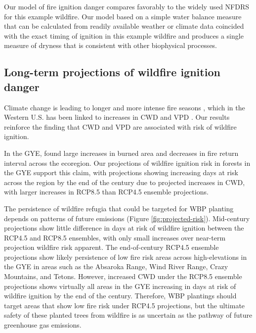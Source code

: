 \documentclass[11p]{article}
\begin{document}
Our model of fire ignition danger compares favorably to the widely used NFDRS for this example wildfire. Our model based on a simple water balance measure that can be calculated from readily available weather or climate data coincided with the exact timing of ignition in this example wildfire and produces a single measure of dryness that is consistent with other biophysical processes.

\subsection{Long-term projections of wildfire ignition danger}

Climate change is leading to longer and more intense fire seasons \citep{abatzoglouProjectedIncreasesWestern2021,littellReviewRelationshipsDrought2016,jollyClimateinducedVariationsGlobal2015}, which in the Western U.S. has been linked to increases in CWD and VPD \citep{abatzoglouImpactAnthropogenicClimate2016}. Our results reinforce the finding that CWD and VPD are associated with risk of wildfire ignition.

In the GYE, \citet{westerlingContinuedWarmingCould2011} found large increases in burned area and decreases in fire return interval across the ecoregion. Our projections of wildfire ignition risk in forests in the GYE support this claim, with projections showing increasing days at risk across the region by the end of the century due to projected increases in CWD, with larger increases in RCP8.5 than RCP4.5 ensemble projections.

The persistence of wildfire refugia that could be targeted for WBP planting depends on patterns of future emissions (Figure \ref{fig:projected-risk}). Mid-century projections show little difference in days at risk of wildfire ignition between the RCP4.5 and RCP8.5 ensembles, with only small increases over near-term projection wildfire risk apparent. The end-of-century RCP4.5 ensemble projections show likely persistence of low fire risk areas across high-elevations in the GYE in areas such as the Absaroka Range, Wind River Range, Crazy Mountains, and Tetons. However, increased CWD under the RCP8.5 ensemble projections shows virtually all areas in the GYE increasing in days at risk of wildfire ignition by the end of the century. Therefore, WBP plantings should target areas that show low fire risk under RCP4.5 projections, but the ultimate safety of these planted trees from wildfire is as uncertain as the pathway of future greenhouse gas emissions.
\end{document}
